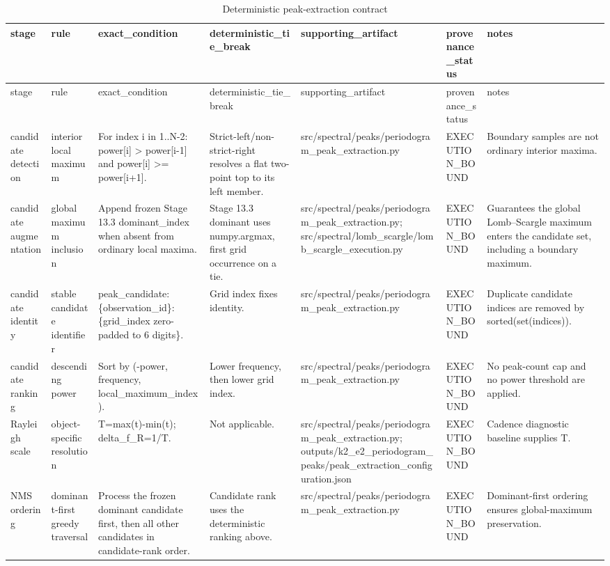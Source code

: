 \begin{longtable}{lllllll}
\caption{Deterministic peak-extraction contract}\\
\toprule
stage & rule & exact\_condition & deterministic\_tie\_break & supporting\_artifact & provenance\_status & notes \\
\midrule
\endfirsthead
\toprule
stage & rule & exact\_condition & deterministic\_tie\_break & supporting\_artifact & provenance\_status & notes \\
\midrule
\endhead
candidate detection & interior local maximum & For index i in 1..N-2: power[i] > power[i-1] and power[i] >= power[i+1]. & Strict-left/non-strict-right resolves a flat two-point top to its left member. & src/spectral/peaks/periodogram\_peak\_extraction.py & EXECUTION\_BOUND & Boundary samples are not ordinary interior maxima. \\
candidate augmentation & global maximum inclusion & Append frozen Stage 13.3 dominant\_index when absent from ordinary local maxima. & Stage 13.3 dominant uses numpy.argmax, first grid occurrence on a tie. & src/spectral/peaks/periodogram\_peak\_extraction.py; src/spectral/lomb\_scargle/lomb\_scargle\_execution.py & EXECUTION\_BOUND & Guarantees the global Lomb–Scargle maximum enters the candidate set, including a boundary maximum. \\
candidate identity & stable candidate identifier & peak\_candidate:\{observation\_id\}:\{grid\_index zero-padded to 6 digits\}. & Grid index fixes identity. & src/spectral/peaks/periodogram\_peak\_extraction.py & EXECUTION\_BOUND & Duplicate candidate indices are removed by sorted(set(indices)). \\
candidate ranking & descending power & Sort by (-power, frequency, local\_maximum\_index). & Lower frequency, then lower grid index. & src/spectral/peaks/periodogram\_peak\_extraction.py & EXECUTION\_BOUND & No peak-count cap and no power threshold are applied. \\
Rayleigh scale & object-specific resolution & T=max(t)-min(t); delta\_f\_R=1/T. & Not applicable. & src/spectral/peaks/periodogram\_peak\_extraction.py; outputs/k2\_e2\_periodogram\_peaks/peak\_extraction\_configuration.json & EXECUTION\_BOUND & Cadence diagnostic baseline supplies T. \\
NMS ordering & dominant-first greedy traversal & Process the frozen dominant candidate first, then all other candidates in candidate-rank order. & Candidate rank uses the deterministic ranking above. & src/spectral/peaks/periodogram\_peak\_extraction.py & EXECUTION\_BOUND & Dominant-first ordering ensures global-maximum preservation. \\

\end{longtable}
